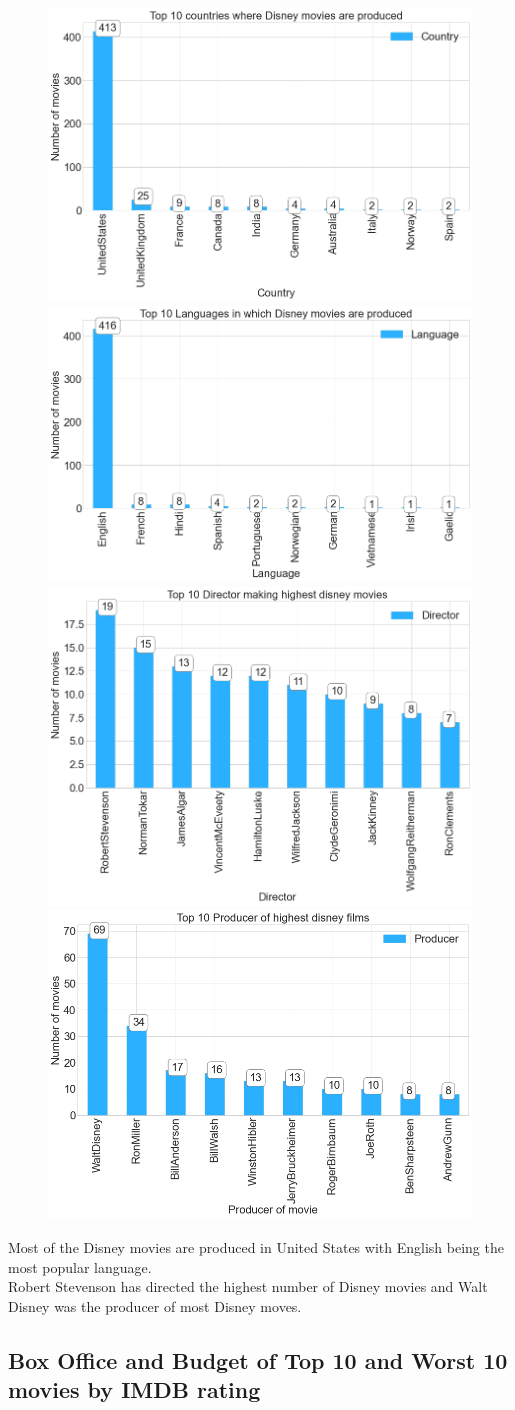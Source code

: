 \documentclass{article}
\begin{document}
    \begin{figure}[htp]
    \centering
       \includegraphics[width=.4\textwidth]{figures/9.png}\hfill
    \includegraphics[width=.4\textwidth]{figures/10.png}
     \includegraphics[width=.4\textwidth]{figures/11.png}\hfill
    \includegraphics[width=.4\textwidth]{figures/12.png}
    \end{figure}
Most of the Disney movies are produced in United States with  English being the most popular language.\\
Robert Stevenson has directed the highest number of Disney movies and Walt Disney was the producer of most Disney moves.
\newpage

\subsection{Box Office and Budget of Top 10 and Worst 10 movies by IMDB rating }
\end{document}
